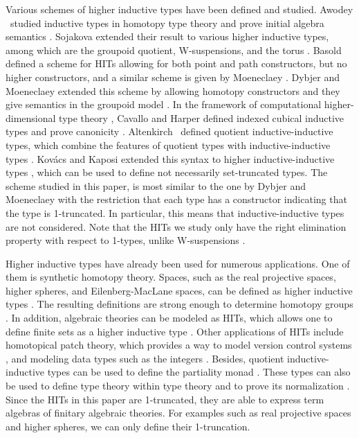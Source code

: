 Various schemes of higher inductive types have been defined and studied.
Awodey \etal \ studied inductive types in homotopy type theory and prove initial
algebra semantics \cite{AwodeyGS12}.
Sojakova extended their result to various higher inductive types, among which
are the groupoid quotient, W-suspensions, and the torus \cite{Sojakova15,sojakovaPhD}.
Basold \etal \ \cite{BasoldGW17} defined a scheme for HITs allowing for both point and path constructors,
but no higher constructors, and a similar scheme is given by
Moeneclaey \cite{moeneclaey2016schema}. 
Dybjer and Moeneclaey extended this scheme by allowing homotopy constructors and
they give semantics in the groupoid model \cite{DBLP:journals/entcs/DybjerM18}.
In the framework of computational higher-dimensional type theory \cite{AngiuliHW17},
Cavallo and Harper defined indexed cubical inductive types and prove canonicity \cite{CavalloH19}.
Altenkirch \etal \ defined quotient inductive-inductive types, which combine the features
of quotient types with inductive-inductive types \cite{forsberg2010inductive,AltenkirchCDKF18}.
Kov\'acs and Kaposi extended this syntax to higher inductive-inductive types \cite{KaposiK18},
which can be used to define not necessarily set-truncated types.
The scheme studied in this paper, is most similar to the one by Dybjer and Moeneclaey \cite{DBLP:journals/entcs/DybjerM18}
with the restriction that each type has a constructor indicating that the type is 1-truncated.
In particular, this means that inductive-inductive types are not considered.
Note that the HITs we study only have the right elimination property with respect to 1-types,
unlike W-suspensions \cite{Sojakova15,sojakovaPhD}.

Higher inductive types have already been used for numerous applications.
One of them is synthetic homotopy theory.
Spaces, such as the real projective spaces, higher spheres, and Eilenberg-MacLane spaces,
can be defined as higher inductive types \cite{licata2013pi,LicataF14,DBLP:conf/lics/BuchholtzR17,hottbook}.
The resulting definitions are strong enough to determine homotopy groups
\cite{licata2013pi,LicataS13}.
In addition, algebraic theories can be modeled as HITs, which allows one
to define finite sets as a higher inductive type \cite{frumin2018finite}.
Other applications of HITs include homotopical patch theory, which provides a way
to model version control systems \cite{AngiuliMLH16}, and modeling data types
such as the integers \cite{BasoldGW17,altenkirchscoccola}.
Besides, quotient inductive-inductive types can be used to define the partiality monad \cite{AltenkirchDK17}.
These types can also be used to define type theory within type theory \cite{AltenkirchK16}
and to prove its normalization \cite{DBLP:journals/lmcs/AltenkirchK17}.
Since the HITs in this paper are 1-truncated, they are able to express term algebras of finitary algebraic theories.
For examples such as real projective spaces and higher spheres, we can only define their 1-truncation.

